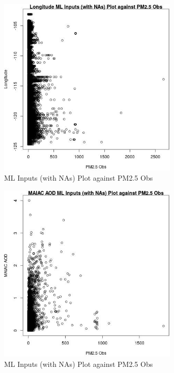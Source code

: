 \begin{figure} 
\centering  
\includegraphics[width=0.77\textwidth]{Code_Outputs/Report_ML_input_PM25_Step4_part_e_de_duplicated_aves2008-18_noNAMwNAs_LongitudevPM25_Obs.jpg} 
\caption{\label{fig:Report_ML_input_PM25_Step4_part_e_de_duplicated_aves2008-18_noNAMwNAsLongitudevPM25_Obs}ML Inputs (with NAs) Plot against PM2.5 Obs} 
\end{figure} 
 

\begin{figure} 
\centering  
\includegraphics[width=0.77\textwidth]{Code_Outputs/Report_ML_input_PM25_Step4_part_e_de_duplicated_aves2008-18_noNAMwNAs_MAIAC_AODvPM25_Obs.jpg} 
\caption{\label{fig:Report_ML_input_PM25_Step4_part_e_de_duplicated_aves2008-18_noNAMwNAsMAIAC_AODvPM25_Obs}ML Inputs (with NAs) Plot against PM2.5 Obs} 
\end{figure} 
 
